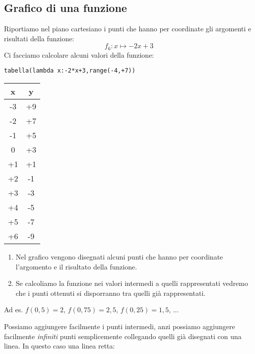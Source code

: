 \subsection{Grafico di una funzione}

Riportiamo nel piano cartesiano i punti che hanno per coordinate gli 
argomenti e risultati della funzione: 
\[f_6: x \mapsto -2x+3\] 
Ci facciamo calcolare alcuni valori della funzione:

\begin{minipage}{.49\textwidth}
\begin{lstlisting}
tabella(lambda x:-2*x+3,range(-4,+7))
\end{lstlisting}
\begin{center}
\begin{tabular}{c|c}
x & y\\\hline
-3 & +9\\
-2 & +7\\
-1 & +5\\
0 & +3\\
+1 & +1\\
+2 & -1\\
+3 & -3\\
+4 & -5\\
+5 & -7\\
+6 & -9
\end{tabular}
\end{center}
\end{minipage}
\begin{minipage}{.49\textwidth}
\begin{center} \scalebox{.7}{\graficoa} \end{center}
\end{minipage}

\begin{minipage}{.49\textwidth}
\begin{osservazione}
\begin{enumerate}
\item Nel grafico vengono disegnati alcuni punti che hanno per coordinate 
l'argomento e il risultato della funzione.
\item Se calcoliamo la funzione nei valori intermedi a quelli rappresentati 
vedremo che i punti ottenuti si disporranno tra quelli già rappresentati. 
\end{enumerate}
\end{osservazione}

Ad es. 
\(f(0,5)=2\), \(f(0,75)=2,5\), \(f(0,25)=1,5\), ...

Possiamo aggiungere facilmente i punti intermedi, anzi possiamo aggiungere 
facilmente \emph{infiniti} punti semplicemente collegando quelli già 
disegnati con una linea. In questo caso una linea retta:
\end{minipage}
\begin{minipage}{.49\textwidth}
\begin{center} \scalebox{.7}{\graficob} \end{center}
\end{minipage}


